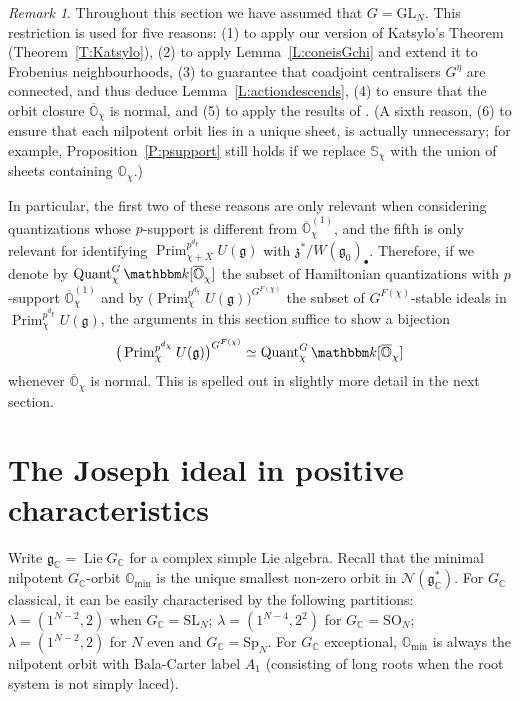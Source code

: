 \documentclass[twoside,12pt,reqno]{amsart}
\theoremstyle{remark}
\newtheorem{Remark}[Theorem]{Remark}
\numberwithin{equation}{section}
\def\k{{\mathbbm k}}
\def\Lie{\operatorname{Lie}}
\def\Quant{\operatorname{Quant}}
\def\Prim{\operatorname{Prim}}
\def\C{{\mathbb C}}
\def\O{{\mathbb O}}
\def\cO{{\overline{\mathbb O}}}
\def\bbS{\mathbb{S}}
\def\GL{\mathrm{GL}}
\def\SL{\mathrm{SL}}
\def\SO{\mathrm{SO}}
\def\Sp{\mathrm{Sp}}
\def\g{{\mathfrak g}}
\def\z{\mathfrak{z}}
\newcommand{\Nc}{\mathcal{N}}
\renewcommand{\min}{\operatorname{min}}
\begin{document}
\begin{Remark}
\label{R:whyGLN}
    Throughout this section we have assumed that $G=\GL_N$. This restriction is used for five reasons: 
    (1) to apply our version of Katsylo's Theorem (Theorem~\ref{T:Katsylo}), 
    (2) to apply Lemma~\ref{L:coneisGchi} and extend it to Frobenius neighbourhoods, 
    (3) to guarantee that coadjoint centralisers $G^\eta$ are connected, and thus deduce Lemma~\ref{L:actiondescends}, 
    (4) to ensure that the orbit closure $\cO_\chi$ is normal, and 
    (5) to apply the results of \cite{GT}.
    (A sixth reason, (6) to ensure that each nilpotent orbit lies in a unique sheet, is actually unnecessary; for example, Proposition~\ref{P:psupport} still holds if we replace $\bbS_\chi$ with the union of sheets containing $\O_\chi$.)

    
    In particular, the first two of these reasons are only relevant when considering quantizations whose $p$-support is different from $\cO_\chi^{(1)}$, and the fifth is only relevant for identifying $\Prim_{\chi+X}^{p^{d_\chi}} U(\g)$ with $\z^*/W(\g_0)_\bullet$. 
    Therefore, if we denote by $\Quant^G_{\chi} \k[\cO_\chi]$ the subset of Hamiltonian quantizations with $p$-support $\cO_\chi^{(1)}$ and by $\big(\Prim_\chi^{{p^{d_\chi}}} U(\g)\big)^{G^{F(\chi)}}$ the subset of $G^{F(\chi)}$-stable ideals in $\Prim_\chi^{{p^{d_\chi}}} U(\g)$, the arguments in this section suffice to show a bijection $$\big(\Prim_\chi^{{p^{d_\chi}}} U(\g)\big)^{G^{F(\chi)}} \simeq \Quant^G_{\chi} \k[\cO_\chi]$$ whenever $\cO_\chi$ is normal. This is spelled out in slightly more detail in the next section. 
\end{Remark}

\section{The Joseph ideal in positive characteristics}\label{s:Joseph}

Write $\g_\C = \Lie G_\C$ for a complex simple Lie algebra. Recall that the minimal nilpotent $G_\C$-orbit $\O_{\min}$ is the unique smallest non-zero orbit in $\Nc(\g_\C^*)$. For $G_\C$ classical, it can be easily characterised by the following partitions: $\lambda = (1^{N-2}, 2)$ when $G_\C = \SL_N$; $\lambda = (1^{N-4}, 2^2)$ for $G_\C = \SO_N$; $\lambda = (1^{N-2}, 2)$ for $N$ even and $G_\C = \Sp_N$. For $G_\C$ exceptional, $\O_{\min}$ is always the nilpotent orbit with Bala-Carter label $A_1$ (consisting of long roots when the root system is not simply laced).
\end{document}
